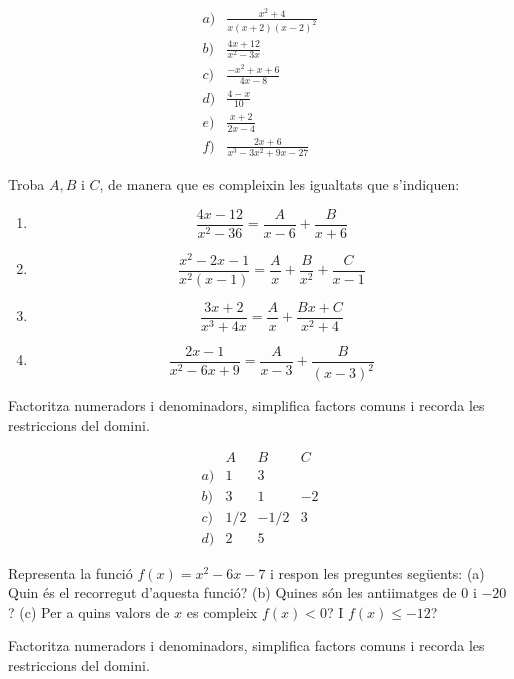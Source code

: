 \begin{solucio}
\[
\begin{array}{ll}
a) & \frac{x^{2}+4}{x(x+2)(x-2)^{2}} \\
b) & \frac{4x+12}{x^{2}-3x} \\
c) & \frac{-x^{2}+x+6}{4x-8} \\
d) & \frac{4-x}{10} \\
e) & \frac{x+2}{2x-4} \\
f) & \frac{2x+6}{x^{3}-3x^{2}+9x-27}
\end{array}
\]
\end{solucio}

\begin{exercici}
Troba $A,B$ i $C$, de manera que es compleixin les igualtats que
s'indiquen:

\begin{enumerate}
\item[a)]
\[
\frac{4x-12}{x^{2}-36}=\frac{A}{x-6}+\frac{B}{x+6}
\]

\item[b)]
\[
\frac{x^{2}-2x-1}{x^{2}(x-1)}=\frac{A}{x}+\frac{B}{x^{2}}+\frac{C}{x-1}
\]

\item[c)]
\[
\frac{3x+2}{x^{3}+4x}=\frac{A}{x}+\frac{Bx+C}{x^{2}+4}
\]

\item[d)]
\[
\frac{2x-1}{x^{2}-6x+9}=\frac{A}{x-3}+\frac{B}{(x-3)^{2}}
\]
\end{enumerate}
\end{exercici}
\begin{indicacio}
Factoritza numeradors i denominadors, simplifica factors comuns i recorda les restriccions del domini.
\end{indicacio}

\begin{solucio}
\[
\begin{array}{llll}
& A & B & C \\
a) & 1 & 3 & \\
b) & 3 & 1 & -2 \\
c) & 1/2 & -1/2 & 3 \\
d) & 2 & 5 &
\end{array}
\]
\end{solucio}

\begin{exercici}
Representa la funció $f(x)=x^{2}-6x-7$ i respon les preguntes
següents: (a) Quin és el recorregut d'aquesta funció?
(b) Quines són les antiimatges de $0$ i $-20$?
(c) Per a quins valors de $x$ es compleix $f(x)<0$?
I $f(x)\leq -12$?
\end{exercici}
\begin{indicacio}
Factoritza numeradors i denominadors, simplifica factors comuns i recorda les restriccions del domini.
\end{indicacio}

